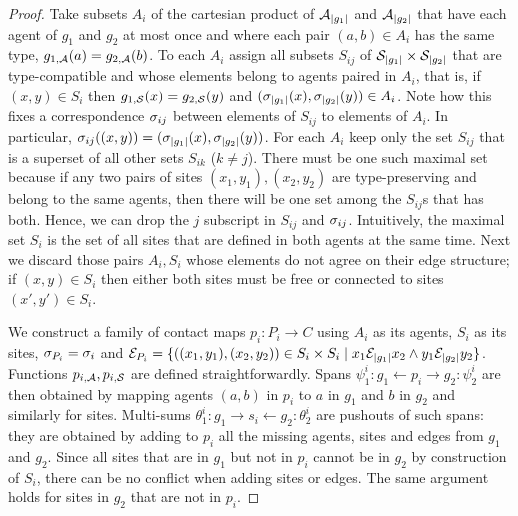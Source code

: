 \begin{proof}
  Take subsets $A_i$ of the cartesian product
  of $\mathcal{A}_{\left|g_1\right|}$ and $\mathcal{A}_{\left|g_2\right|}$
  that have each agent of $g_1$ and $g_2$ at most once
  and where each pair $(a,b) \in A_i$ has the same type,
  \ie $g_{1,\mathcal{A}}(a) = g_{2,\mathcal{A}}(b)$.
  To each $A_i$ assign all subsets $S_{ij}$ of
  $\mathcal{S}_{\left|g_1\right|} \times \mathcal{S}_{\left|g_2\right|}$
  that are type-compatible
  and whose elements belong to agents paired in $A_i$,
  that is, if $(x,y) \in S_i$
  then $g_{1,\mathcal{S}}(x) = g_{2,\mathcal{S}}(y)$
  and $(\sigma_{\left|g_1\right|}(x),\sigma_{\left|g_2\right|}(y)) \in A_i$.
  Note how this fixes a correspondence $\sigma_{ij}$
  between elements of $S_{ij}$ to elements of $A_i$.
  In particular,
  $\sigma_{ij}((x,y)) =
     (\sigma_{\left|g_1\right|}(x),\sigma_{\left|g_2\right|}(y))$.
  For each $A_i$ keep only the set $S_{ij}$
  that is a superset of all other sets $S_{ik}$ ($k \neq j$).
  There must be one such maximal set because
  if any two pairs of sites $(x_1,y_1),(x_2,y_2)$
  are type-preserving and belong to the same agents,
  then there will be one set among the $S_{ij}$s that has both.
  Hence, we can drop the $j$ subscript
  in $S_{ij}$ and $\sigma_{ij}$.
  Intuitively, the maximal set $S_i$ is the set of all sites
  that are defined in both agents at the same time.
  Next we discard those pairs $A_i,S_i$
  whose elements do not agree on their edge structure;
  if $(x,y) \in S_i$ then either both sites must be free
  or connected to sites $(x',y') \in S_i$.

  We construct a family of contact maps $p_i: P_i \to C$
  using $A_i$ as its agents, $S_i$ as its sites,
  $\sigma_{P_i} = \sigma_i$ and
  $\mathcal{E}_{P_i} = \{((x_1,y_1), (x_2,y_2)) \in S_i \times S_i \; | \;
     x_1 \mathcal{E}_{\left|g_1\right|} x_2 \wedge
     y_1 \mathcal{E}_{\left|g_2\right|} y_2\}$.
  Functions $p_{i,\mathcal{A}},p_{i,\mathcal{S}}$
  are defined straightforwardly.
  Spans $\psi^i_1: g_1 \gets p_i \to g_2 :\psi^i_2$
  are then obtained by mapping agents $(a,b)$ in $p_i$
  to $a$ in $g_1$ and $b$ in $g_2$
  and similarly for sites.
  Multi-sums $\theta^i_1: g_1 \to s_i \gets g_2 :\theta^i_2$
  are pushouts of such spans:
  they are obtained by adding to $p_i$
  all the missing agents, sites and edges from $g_1$ and $g_2$.
  Since all sites that are in $g_1$ but not in $p_i$
  cannot be in $g_2$ by construction of $S_i$,
  there can be no conflict when adding sites or edges.
  The same argument holds for sites in $g_2$ that are not in $p_i$.


\end{proof}
